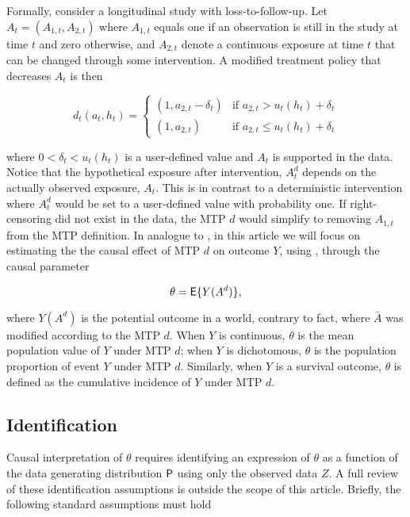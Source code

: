 \documentclass[]{jss}
\begin{document}
Formally, consider a longitudinal study with loss-to-follow-up. Let
\(A_t = (A_{1, t}, A_{2, t})\) where \(A_{1, t}\) equals one if an
observation is still in the study at time \(t\) and zero otherwise, and
\(A_{2, t}\) denote a continuous exposure at time \(t\) that can be
changed through some intervention. A modified treatment policy that
decreases \(A_t\) is then

\begin{equation}
d_t(a_t,h_t)=
\begin{cases}
(1, a_{2,t} - \delta_t) & \text{if } a_{2,t} > u_t(h_t) + \delta_t \\
(1, a_{2,t}) & \text{if } a_{2,t} \leq u_t(h_t) + \delta_t
\end{cases}
\end{equation}

where \(0 < \delta_t < u_t(h_t)\) is a user-defined value and \(A_t\) is
supported in the data. Notice that the hypothetical exposure after
intervention, \(A^{d}_t\) depends on the actually observed exposure,
\(A_t\). This is in contrast to a deterministic intervention where
\(A^{d}_t\) would be set to a user-defined value with probability one.
If right-censoring did not exist in the data, the MTP \(d\) would
simplify to removing \(A_{1, t}\) from the MTP definition. In analogue
to \citet{diazNonparametricCausalEffects2020a}, in this article we will
focus on estimating the the causal effect of MTP \(d\) on outcome \(Y\),
using , through the causal parameter

\begin{equation}
\theta = \mathsf{E}\{Y(A^d)\}\text{,}
\end{equation}

where \(Y(A^d)\) is the potential outcome in a world, contrary to fact,
where \(\bar{A}\) was modified according to the MTP \(d\). When \(Y\) is
continuous, \(\theta\) is the mean population value of \(Y\) under MTP
\(d\); when \(Y\) is dichotomous, \(\theta\) is the population
proportion of event \(Y\) under MTP \(d\). Similarly, when \(Y\) is a
survival outcome, \(\theta\) is defined as the cumulative incidence of
\(Y\) under MTP \(d\).

\hypertarget{identification}{%
\subsection{Identification}\label{identification}}

Causal interpretation of \(\theta\) requires identifying an expression
of \(\theta\) as a function of the data generating distribution
\(\mathsf{P}\) using only the observed data \(Z\). A full review of these
identification assumptions is outside the scope of this article.
Briefly, the following standard assumptions must hold
\end{document}
